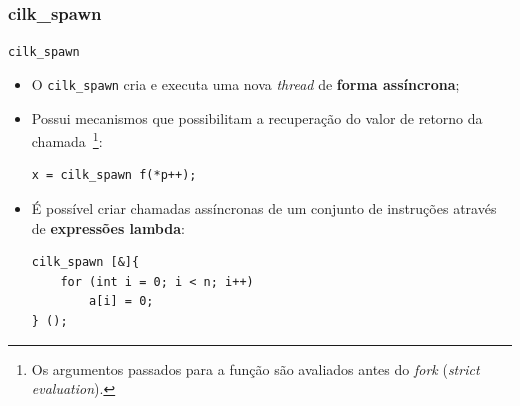 \documentclass{beamer}
\begin{document}
\subsubsection{cilk\_spawn}
{
\begin{frame}[fragile]{\texttt{cilk\_spawn}}
\begin{itemize}
    \item O \texttt{cilk\_spawn} cria e executa uma nova \textit{thread}
    de \textbf{forma assíncrona};
    \item Possui mecanismos que possibilitam a recuperação do valor de retorno
    da chamada~\footnote{Os argumentos passados para a função são
    avaliados antes do \textit{fork} (\textit{strict evaluation}).}:
\begin{lstlisting}
x = cilk_spawn f(*p++);
\end{lstlisting}
\pause
    \item É possível criar chamadas assíncronas de um conjunto de instruções
    através de \textbf{expressões lambda}:
\begin{lstlisting}
cilk_spawn [&]{
    for (int i = 0; i < n; i++)
        a[i] = 0;
} ();
\end{lstlisting}
\end{itemize}
\end{frame}
}
\end{document}
